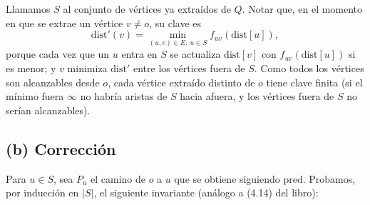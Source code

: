 Llamamos $S$ al conjunto de vértices ya extraídos de $Q$. Notar que, en el momento en que se extrae un vértice $v\neq o$, su clave es
\[ \mathrm{dist}'(v)=\min_{(u,v)\in E,\ u\in S} f_{uv}(\mathrm{dist}[u]), \]
porque cada vez que un $u$ entra en $S$ se actualiza $\mathrm{dist}[v]$ con $f_{uv}(\mathrm{dist}[u])$ si es menor; y $v$ minimiza $\mathrm{dist}'$ entre los vértices fuera de $S$. Como todos los vértices son alcanzables desde $o$, cada vértice extraído distinto de $o$ tiene clave finita (si el mínimo fuera $\infty$ no habría aristas de $S$ hacia afuera, y los vértices fuera de $S$ no serían alcanzables).

\subsection*{(b) Corrección}

Para $u\in S$, sea $P_u$ el camino de $o$ a $u$ que se obtiene siguiendo $\mathrm{pred}$. Probamos, por inducción en $|S|$, el siguiente invariante (análogo a (4.14) del libro):

